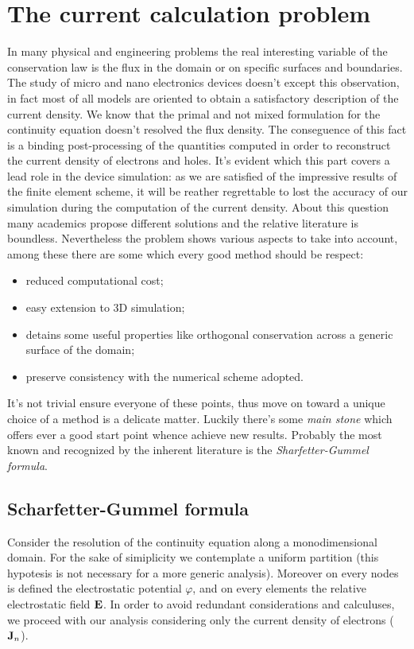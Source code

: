 \chapter{The current calculation problem}

In many physical and engineering problems the real interesting variable of the conservation law is the flux in the domain or on specific surfaces and boundaries. The study of micro and nano electronics devices doesn't except this observation, in fact most of all models are oriented to obtain a satisfactory description of the current density.
 We know that the primal and not mixed formulation for  the continuity equation doesn't resolved  the flux density. The conseguence of this fact is a binding post-processing of the quantities computed in order to reconstruct the current density of electrons and holes.
It's evident which this part covers a lead role in the device simulation: 
as we are satisfied of the impressive results of the finite element scheme, it will be reather regrettable to lost the accuracy of our simulation during the computation of the current density.
About this question many academics propose different solutions and  the relative literature is boundless.
 Nevertheless the problem shows various aspects to take into account, among these there are some which every good method should be respect:	
 \begin{itemize}
 \item reduced computational cost;
 \item easy extension to 3D simulation;
 \item detains some useful properties like orthogonal conservation across a generic surface of the domain;
 \item preserve consistency with the numerical scheme adopted.
 \end{itemize}
 It's not trivial ensure everyone of these points, thus move on toward a unique choice of a method is a delicate matter. Luckily there's some \textit{main stone} which offers ever a good start point whence achieve new results. Probably the most known and recognized by the inherent literature is the \textit{Sharfetter-Gummel formula}.

\section{Scharfetter-Gummel formula}

Consider the resolution of the continuity equation along a monodimensional domain. For the sake of simiplicity we contemplate a uniform partition (this hypotesis is not necessary for a more generic analysis). Moreover on every nodes is defined the electrostatic potential $\varphi$, and on every elements the relative electrostatic field $\mathbf{E}$. In order to avoid redundant considerations and calculuses, we proceed with our analysis considering only the current density of electrons ($\mathbf{J}_n$).

